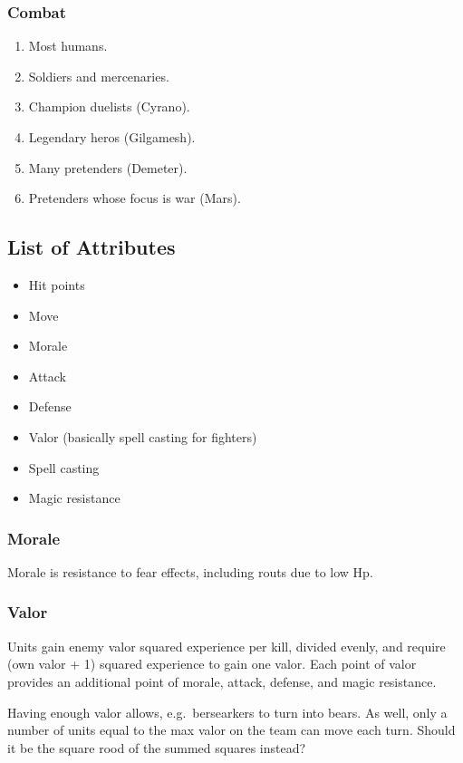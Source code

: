 \documentclass[12pt,letterpaper]{article}
\begin{document}
\subsubsection{Combat}

\begin{enumerate}
	\item Most humans.
	\item Soldiers and mercenaries.
	\item Champion duelists (Cyrano).
	\item Legendary heros (Gilgamesh).
	\item Many pretenders (Demeter).
	\item Pretenders whose focus is war (Mars).
\end{enumerate}

\subsection{List of Attributes}

\begin{itemize}
	\item Hit points
	\item Move
	\item Morale
	\item Attack
	\item Defense
	\item Valor (basically spell casting for fighters)
	\item Spell casting
	\item Magic resistance
\end{itemize}

\subsubsection{Morale}
Morale is resistance to fear effects, including routs due to low Hp.

\subsubsection{Valor}

Units gain enemy valor squared experience per kill, divided evenly,
and require (own valor + 1) squared experience to gain one valor.
Each point of valor provides an additional point of morale, attack, defense, and magic resistance.

Having enough valor allows, e.g.\ bersearkers to turn into bears.
As well, only a number of units equal to the max valor on the team can move each turn.
Should it be the square rood of the summed squares instead?
\end{document}

